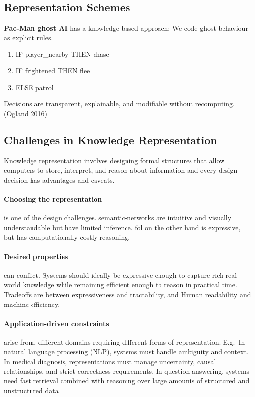 \subsection*{Representation Schemes}


\begin{bsp}
    \label{bsp:pacman}
    \textbf{Pac-Man ghost AI} has a knowledge-based approach: We code ghost behaviour as explicit rules.
    \begin{enumerate}
        \item IF player\_nearby THEN chase
        \item IF frightened THEN flee
        \item ELSE patrol
    \end{enumerate}
    Decisions are transparent, explainable, and modifiable without recomputing.
    (Ogland 2016)
\end{bsp}

\subsection*{Challenges in Knowledge Representation}
Knowledge representation involves designing formal structures that allow computers to store, interpret, and reason
about information and every design decision has advantages and caveats.

\paragraph{Choosing the representation} is one of the design challenges.
\Glspl{semantic-network} are intuitive and visually understandable but have limited inference. \Gls{fol} on the other
hand is
expressive, but has computationally costly reasoning.

\paragraph{Desired properties} can conflict.
Systems should ideally be expressive enough to capture rich real-world knowledge while remaining efficient enough to reason in practical time.
Tradeoffs are between expressiveness and tractability, and Human readability and machine efficiency.

\paragraph{Application-driven constraints} arise from, different domains requiring different forms of representation.
E.g.\ In natural language processing (NLP), systems must handle ambiguity and context.
In medical diagnosis, representations must manage uncertainty, causal relationships, and strict correctness
requirements.
In question answering, systems need fast retrieval combined with reasoning over large amounts of structured and unstructured data

